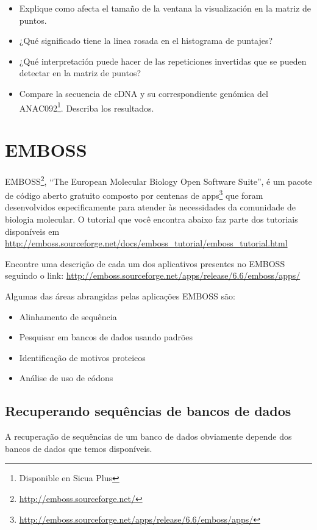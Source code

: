 \documentclass[letter,11pt]{book}
\begin{document}
{\color{red}
\begin{itemize}
\item Explique como afecta el tamaño de la ventana la visualización en la matriz de puntos.
\item ¿Qué significado tiene la linea rosada en el histograma de puntajes?
\item ¿Qué interpretación puede hacer de las repeticiones invertidas que se pueden detectar en la matriz de puntos?
\item Compare la secuencia de cDNA y su correspondiente genómica del ANAC092\footnote{Disponible en Sicua Plus}. Describa los resultados.
\end{itemize}
}

\chapter{EMBOSS}

EMBOSS\footnote{\url{http://emboss.sourceforge.net/}},  ``The European Molecular Biology Open Software Suite'', é um pacote de código aberto gratuito composto por centenas de apps\footnote{\url{http://emboss.sourceforge.net/apps/release/6.6/emboss/apps/}} que foram desenvolvidos especificamente para atender às necessidades da comunidade de biologia molecular. O tutorial que você encontra abaixo faz parte dos tutoriais disponíveis em \url{http://emboss.sourceforge.net/docs/emboss_tutorial/emboss_tutorial.html}

Encontre uma descrição de cada um dos aplicativos presentes no EMBOSS seguindo o link: \url{http://emboss.sourceforge.net/apps/release/6.6/emboss/apps/}

Algumas das áreas abrangidas pelas aplicações EMBOSS são:

\begin{itemize}
\item Alinhamento de sequência
\item Pesquisar em bancos de dados usando padrões
\item Identificação de motivos proteicos
\item Análise de uso de códons
\end{itemize}

\section{Recuperando sequências de bancos de dados}

A recuperação de sequências de um banco de dados obviamente depende dos bancos de dados que temos disponíveis.
\end{document}
